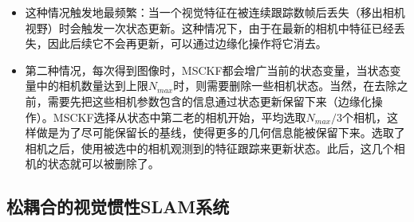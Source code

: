 \begin{itemize}
    \item 这种情况触发地最频繁：当一个视觉特征在被连续跟踪数帧后丢失（移出相机视野）时会触发一次状态更新。这种情况下，由于在最新的相机中特征已经丢失，因此后续它不会再更新，可以通过边缘化操作将它消去。
    \item 第二种情况，每次得到图像时，MSCKF都会增广当前的状态变量，当状态变量中的相机数量达到上限$N_{max}$时，则需要删除一些相机状态。当然，在去除之前，需要先把这些相机参数包含的信息通过状态更新保留下来（边缘化操作）。MSCKF选择从状态中第二老的相机开始，平均选取$N_{max}/3$个相机，这样做是为了尽可能保留长的基线，使得更多的几何信息能被保留下来。选取了相机之后，使用被选中的相机观测到的特征跟踪来更新状态。此后，这几个相机的状态就可以被删除了。
\end{itemize}

\subsection{松耦合的视觉惯性SLAM系统}
